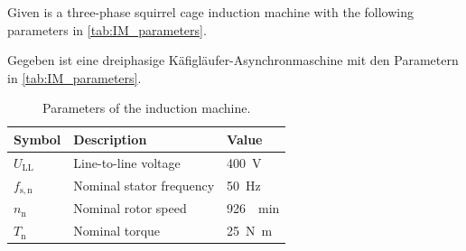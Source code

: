 
Given is a three-phase squirrel cage induction machine with the following parameters in \autoref{tab:IM_parameters}.

\begin{germanblock}
	Gegeben ist eine dreiphasige Käfigläufer-Asynchronmaschine mit den Parametern in \autoref{tab:IM_parameters}.
\end{germanblock}

\begin{table}[htb]
	\caption{Parameters of the induction machine.}
	\centering
	\begin{tabular}{lll}
		\toprule
		Symbol             & Description              & Value                  \\
		\midrule
		$U_{\mathrm{LL}}$  & Line-to-line voltage     & \SI{400}{\volt}        \\
		$f_{\mathrm{s,n}}$ & Nominal stator frequency & \SI{50}{\hertz}        \\
		$n_{\mathrm{n}}$   & Nominal rotor speed      & \SI{926}{\per\minute}  \\
		$T_{\mathrm{n}}$   & Nominal torque           & \SI{25}{\newton\metre} \\
		\bottomrule
	\end{tabular}
	\label{tab:IM_parameters}
\end{table}


